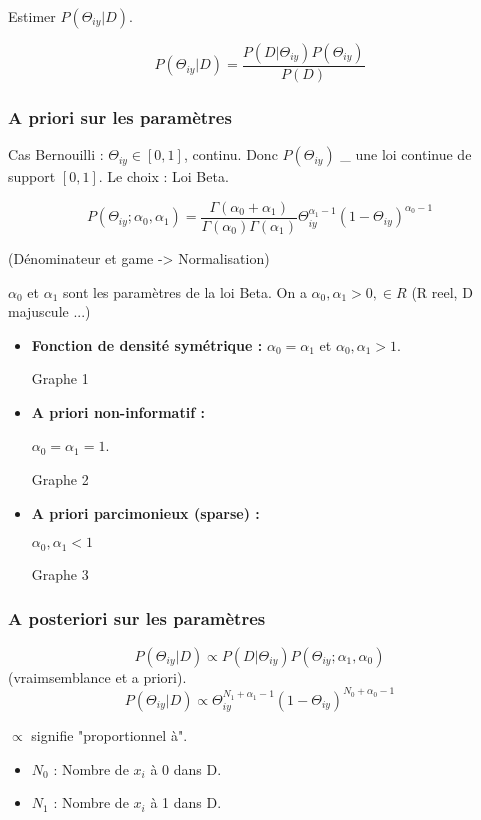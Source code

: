 \documentclass{article}
\begin{document}
Estimer $ P(\Theta_{iy} | D) $.

\[ P(\Theta_{iy} | D) = \frac{P(D | \Theta_{iy})P(\Theta_{iy})}{P(D)} \]

\subsubsection{A priori sur les paramètres}

Cas Bernouilli : $\Theta_{iy} \in [0, 1]$, continu. Donc $P(\Theta_{iy})$ \_ une loi continue de support $[0, 1]$.
Le choix : Loi Beta.

\[ P(\Theta_{iy}; \alpha_0, \alpha_1) = \frac{\Gamma (\alpha_0 + \alpha_1)}{\Gamma (\alpha_0) \Gamma (\alpha_1)} \Theta_{iy}^{\alpha_1 - 1} (1 - \Theta_{iy})^{\alpha_0 - 1} \]

(Dénominateur et game -> Normalisation)

$\alpha_0$ et $\alpha_1$ sont les paramètres de la loi Beta. On a $\alpha_0, \alpha_1 > 0, \in R$ (R reel, D majuscule ...)

\begin{itemize}
\item \textbf{Fonction de densité symétrique : }
$\alpha_0 = \alpha_1$ et $\alpha_0, \alpha_1 > 1$.

Graphe 1

\item \textbf{A priori non-informatif : }

$\alpha_0 = \alpha_1 = 1$.

Graphe 2

\item \textbf{A priori parcimonieux (sparse) : }

$\alpha_0, \alpha_1 < 1$

Graphe 3

\end{itemize}

\subsubsection{A posteriori sur les paramètres}

\[ P(\Theta_{iy} | D) \propto P(D | \Theta_{iy}) P(\Theta_{iy}; \alpha_1, \alpha_0) \] (vraimsemblance et a priori).
\[ P(\Theta_{iy} | D) \propto \Theta_{iy}^{N_1 + \alpha_1 - 1} (1 - \Theta_{iy})^{N_0 + \alpha_0 - 1} \]

$\propto$ signifie "proportionnel à".

\begin{itemize}
\item $N_0$ : Nombre de $x_i$ à 0 dans D.
\item $N_1$ : Nombre de $x_i$ à 1 dans D.
\end{itemize}
\end{document}
